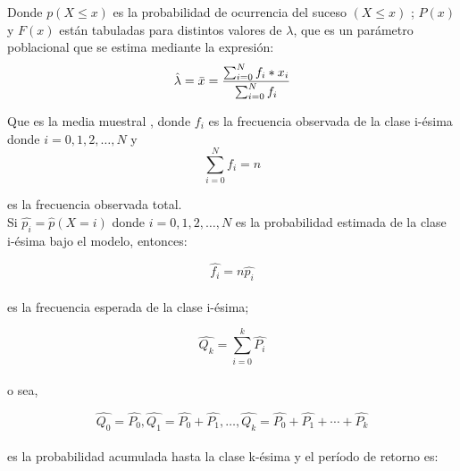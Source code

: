  Donde $p(X\leq x)$ es la probabilidad de ocurrencia del suceso $(X\leq x)$ ; $P(x)$ y $F(x)$ están tabuladas para distintos valores de $\lambda$, que es un parámetro poblacional que se estima mediante la expresión:\\
 
\begin{equation}
\hat{\lambda} =\bar{x} = {\sum_{i=0}^{N}f_i * x_i \over \sum_{i=0}^{N}f_i}
\end{equation}
 
Que es la media muestral , donde $f_i$ es la frecuencia observada de la clase i-ésima donde  $i=0,1,2,…,N$ y\\

\begin{equation}
\sum_{i=0}^{N}f_i = n                                                        
 \end{equation}
 
 es la frecuencia observada total.\\       
 
 Si $\hat{p_i} =\hat{p}(X=i)$  donde $i=0,1,2,…,N$ es la probabilidad estimada de la clase i-ésima bajo
el modelo, entonces: 

\begin{equation}
\hat{f_i} = n\hat{p_i}                                                     
\end{equation}                                                                                   
\\                                                                                                                                                                                                                                    
es la frecuencia esperada de la clase i-ésima;
                                                                                                                                                                                                                                  
\begin{equation}
\hat{Q_k}=\sum_{i=0}^{k}\hat{P_i}                                                     
\end{equation}
\\
o sea, 

\begin{equation}
\hat{Q_0}=\hat{P_0},\hat{Q_1}=\hat{P_0}+\hat{P_1},…,\hat{Q_k}=\hat{P_0}+\hat{P_1}+\cdots+\hat{P_k}
\end{equation}
\\
es la probabilidad acumulada hasta la clase k-ésima y el período de retorno es:

